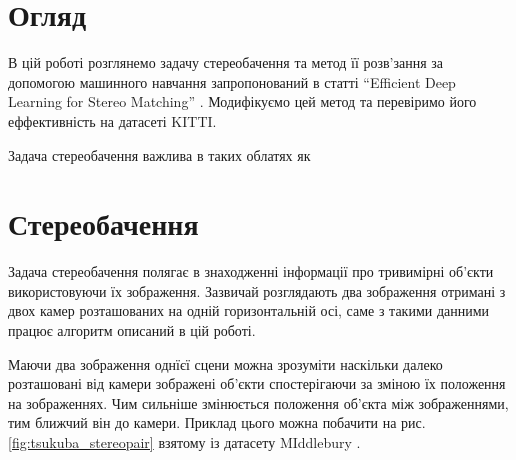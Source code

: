 \documentclass{article}
\theoremstyle{definition}
\begin{document}
\section{Огляд}
В цій роботі розглянемо задачу стереобачення та метод її розв’зання за допомогою машинного навчання запропонований в статті “Efficient Deep Learning for Stereo Matching” \cite{deepLearningForStereo}. Модифікуємо цей метод та перевіримо його еффективність на датасеті KITTI.

Задача стереобачення важлива в таких облатях як 

\section{Стереобачення}
Задача стереобачення полягає в знаходженні інформації про тривимірні об'єкти використовуючи їх зображення. Зазвичай розглядають два зображення отримані з двох камер розташованих на одній горизонтальній осі, саме з такими данними працює алгоритм описаний в цій роботі.

Маючи два зображення однїєї сцени можна зрозуміти наскільки далеко розташовані від камери зображені об'єкти спостерігаючи за зміною їх положення на зображеннях. Чим сильніше змінюється положення об'єкта між зображеннями, тим ближчий він до камери. Приклад цього можна побачити на рис. \ref{fig:tsukuba_stereopair} взятому із датасету MIddlebury \cite{middlebury2001dataset}.
\end{document}
